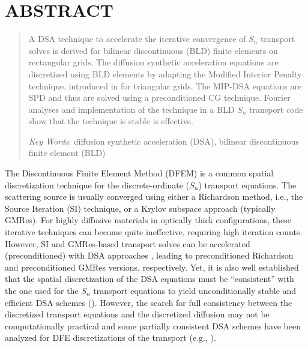 \documentclass{mc2013}
\renewcommand{\(}{\left(}
\renewcommand{\)}{\right)}
\renewcommand{\[}{\left[}
\renewcommand{\]}{\right]}
\newcommand{\sn}{\ensuremath{S_n}\xspace}
\begin{document}
\section*{ABSTRACT} 
\begin{quote}
\begin{small}
A DSA technique to accelerate the iterative convergence of \sn transport solves is derived for bilinear discontinuous (BLD) finite elements on rectangular grids.
The diffusion synthetic acceleration equations are discretized using BLD elements by adapting the Modified Interior Penalty technique, introduced 
in \cite{mip} for triangular grids. The MIP-DSA equations are SPD and thus are solved using a preconditioned CG technique. Fourier analyses and implementation of the technique in a BLD \sn transport code show that the technique is stable is effective. 

\emph{Key Words}: diffusion synthetic acceleration (DSA), bilinear discontinuous finite element (BLD)
\end{small} 
\end{quote}

\setlength{\baselineskip}{14pt}
\normalsize


The Discontinuous Finite Element Method (DFEM) is a common spatial discretization technique for 
the discrete-ordinate (\sn) transport equations. 
The scattering source is usually converged using either a Richardson method, i.e., the Source Iteration (SI) technique,
or a Krylov subspace approach (typically GMRes). 
For highly diffusive materials in optically thick configurations, these iterative techniques 
can become quite ineffective, requiring high iteration counts.
However, SI and GMRes-based transport solves 
can be accelerated (preconditioned) with DSA approaches \cite{dsa_ref},
leading to preconditioned Richardson and preconditioned GMRes versions, respectively.
%
Yet, it is also well established that the spatial discretization of the DSA equations
must be ``consistent'' with the one used for the \sn transport equations to
yield unconditionally stable and efficient DSA schemes
(\cite{dsa_ref,larsen_dsa,consistent_p1,wla,mip}). However, the search for full
consistency between the discretized transport equations and the discretized
diffusion may not be computationally practical \cite{consistent_p1} and 
some partially consistent DSA schemes have been analyzed for DFE discretizations 
of the transport (e.g., \cite{wla,mip}).
\end{document}
